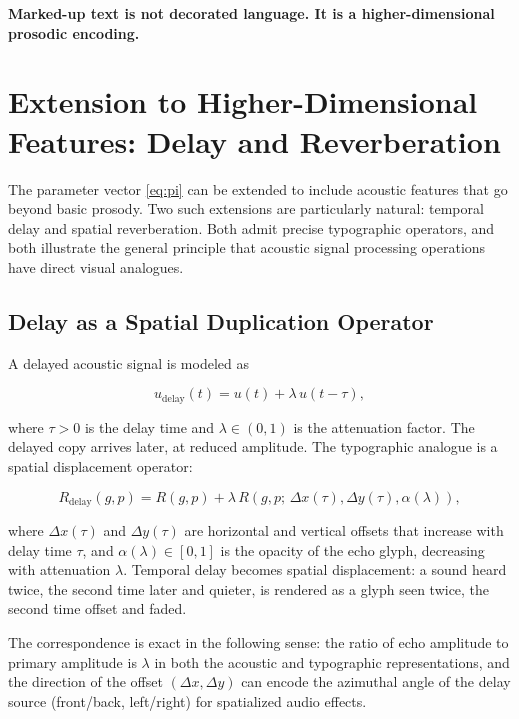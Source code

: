 \documentclass[12pt, a4paper]{article}
\newcommand{\hyperemph}[1]{\textbf{\large #1}}
\begin{document}
\begin{center}
\hyperemph{Marked-up text is not decorated language. It is a higher-dimensional prosodic encoding.}
\end{center}

\section{Extension to Higher-Dimensional Features: Delay and Reverberation}

The parameter vector \eqref{eq:pi} can be extended to include acoustic features that go beyond basic prosody. Two such extensions are particularly natural: temporal delay and spatial reverberation. Both admit precise typographic operators, and both illustrate the general principle that acoustic signal processing operations have direct visual analogues.

\subsection{Delay as a Spatial Duplication Operator}

A delayed acoustic signal is modeled as

\begin{equation}
u_{\mathrm{delay}}(t) = u(t) + \lambda\, u(t - \tau),
\label{eq:delay}
\end{equation}

where $\tau > 0$ is the delay time and $\lambda \in (0, 1)$ is the attenuation factor. The delayed copy arrives later, at reduced amplitude. The typographic analogue is a spatial displacement operator:

\begin{equation}
R_{\mathrm{delay}}(g, p) = R(g, p) + \lambda\, R\!\left(g, p;\, \Delta x(\tau), \Delta y(\tau), \alpha(\lambda)\right),
\label{eq:Rdelay}
\end{equation}

where $\Delta x(\tau)$ and $\Delta y(\tau)$ are horizontal and vertical offsets that increase with delay time $\tau$, and $\alpha(\lambda) \in [0,1]$ is the opacity of the echo glyph, decreasing with attenuation $\lambda$. Temporal delay becomes spatial displacement: a sound heard twice, the second time later and quieter, is rendered as a glyph seen twice, the second time offset and faded.

The correspondence is exact in the following sense: the ratio of echo amplitude to primary amplitude is $\lambda$ in both the acoustic and typographic representations, and the direction of the offset $(\Delta x, \Delta y)$ can encode the azimuthal angle of the delay source (front/back, left/right) for spatialized audio effects.
\end{document}
